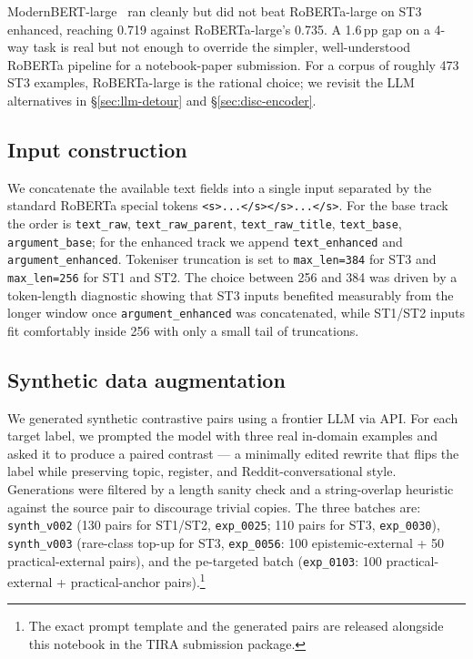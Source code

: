 ModernBERT-large~\cite{warner2024modernbert} ran cleanly but did not beat RoBERTa-large on ST3 enhanced, reaching 0.719 against RoBERTa-large's 0.735. %
A 1.6\,pp gap on a 4-way task is real but not enough to override the simpler, well-understood RoBERTa pipeline for a notebook-paper submission. For a corpus of roughly 473 ST3 examples, RoBERTa-large is the rational choice; we revisit the LLM alternatives in \S\ref{sec:llm-detour} and \S\ref{sec:disc-encoder}.

\subsection{Input construction}
\label{sec:input}

We concatenate the available text fields into a single input separated by the standard RoBERTa special tokens \texttt{<s>...</s></s>...</s>}. For the base track the order is \texttt{text\_raw}, \texttt{text\_raw\_parent}, \texttt{text\_raw\_title}, \texttt{text\_base}, \texttt{argument\_base}; for the enhanced track we append \texttt{text\_enhanced} and \texttt{argument\_enhanced}. Tokeniser truncation is set to \texttt{max\_len=384} for ST3 and \texttt{max\_len=256} for ST1 and ST2. %
The choice between 256 and 384 was driven by a token-length diagnostic showing that ST3 inputs benefited measurably from the longer window once \texttt{argument\_enhanced} was concatenated, while ST1/ST2 inputs fit comfortably inside 256 with only a small tail of truncations. %

\subsection{Synthetic data augmentation}
\label{sec:synth}

We generated synthetic contrastive pairs using a frontier LLM via API. For each target label, we prompted the model with three real in-domain examples and asked it to produce a paired contrast --- a minimally edited rewrite that flips the label while preserving topic, register, and Reddit-conversational style. Generations were filtered by a length sanity check and a string-overlap heuristic against the source pair to discourage trivial copies. The three batches are: \texttt{synth\_v002} (130 pairs for ST1/ST2, \texttt{exp\_0025}; 110 pairs for ST3, \texttt{exp\_0030}), %
\texttt{synth\_v003} (rare-class top-up for ST3, \texttt{exp\_0056}: 100 epistemic-external + 50 practical-external pairs), %
and the \textsf{pe}-targeted batch (\texttt{exp\_0103}: 100 practical-external + practical-anchor pairs).\footnote{The exact prompt template and the generated pairs are released alongside this notebook in the TIRA submission package.} %

